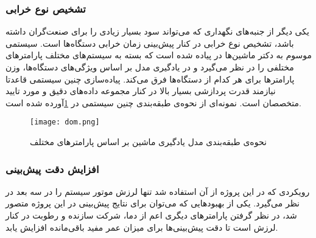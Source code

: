 \subsubsection{تشخیص نوع خرابی}
یکی دیگر از جنبه‌های نگهداری که می‌تواند سود بسیار زیادی را برای صنعت‌گران داشته باشد، تشخیص نوع خرابی در کنار پیش‌بینی زمان خرابی دستگاه‌ها است. سیستمی موسوم به دکتر ماشین‌ها در \cite{patel2020doctor} پیاده شده است که بسته به سیستم‌های مختلف پارامتر‌های مختلفی را در نظر می‌گیرد و در یادگیری مدل بر اساس ویژگی‌های دستگاه‌ها، وزن پارامتر‌ها برای هر کدام از دستگاه‌ها فرق می‌کند. پیاده‌سازی چنین سیستمی قاعدتا نیازمند قدرت پردازشی بسیار بالا در کنار مجموعه داده‌های دقیق و مورد تایید متخصصان است. نمونه‌ای از نحوه‌ی طبقه‌بندی چنین سیستمی در \cref{fig:dom}\cite{patel2020doctor}آورده شده است.

\begin{figure}[!h]
\centerline{\texttt{[image: dom.png]}}
\caption{نحوه‌ی طبقه‌بندی مدل یادگیری ماشین بر اساس پارامتر‌های مختلف\cite{patel2020doctor}}
\label{fig:dom}
\end{figure}


\subsubsection{افزایش دقت پیش‌بینی}
رویکردی که در این پروژه از آن استفاده شد تنها لرزش موتور سیستم را در سه بعد در نظر می‌گیرد. یکی از بهبودهایی که می‌توان برای نتایج پیش‌بینی در این پروژه متصور شد، در نظر گرفتن پارامترهای دیگری اعم از دما، شرکت سازنده و رطوبت در کنار لرزش است تا دقت پیش‌بینی‌ها برای میزان عمر مفید باقی‌مانده افزایش یابد. 
